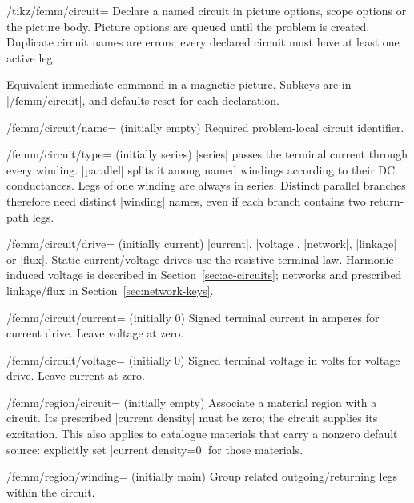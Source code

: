 \begin{key}{/tikz/femm/circuit=}
Declare a named circuit in picture options, scope options or the picture body.
Picture options are queued until the problem is created. Duplicate circuit
names are errors; every declared circuit must have at least one active leg.
\end{key}
\begin{command}{\femmcircuit{}}
Equivalent immediate command in a magnetic picture. Subkeys are in
|/femm/circuit|, and defaults reset for each declaration.
\end{command}
\begin{key}{/femm/circuit/name= (initially empty)}
Required problem-local circuit identifier.
\end{key}
\begin{key}{/femm/circuit/type= (initially series)}
|series| passes the terminal current through every winding. |parallel| splits
it among named windings according to their DC conductances. Legs of one winding
are always in series. Distinct parallel branches therefore need distinct
|winding| names, even if each branch contains two return-path legs.
\end{key}
\begin{key}{/femm/circuit/drive= (initially current)}
|current|, |voltage|, |network|, |linkage| or |flux|. Static current/voltage
drives use the resistive terminal law. Harmonic induced voltage is described
in Section~\ref{sec:ac-circuits}; networks and prescribed linkage/flux in
Section~\ref{sec:network-keys}.
\end{key}
\begin{key}{/femm/circuit/current= (initially 0)}
Signed terminal current in amperes for current drive. Leave voltage at zero.
\end{key}
\begin{key}{/femm/circuit/voltage= (initially 0)}
Signed terminal voltage in volts for voltage drive. Leave current at zero.
\end{key}
\begin{key}{/femm/region/circuit= (initially empty)}
Associate a material region with a circuit. Its prescribed |current density|
must be zero; the circuit supplies its excitation. This also applies to
catalogue materials that carry a nonzero default source: explicitly set
|current density=0| for those materials.
\end{key}
\begin{key}{/femm/region/winding= (initially main)}
Group related outgoing/returning legs within the circuit.
\end{key}
